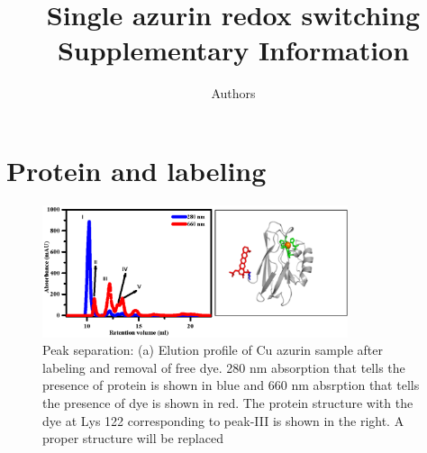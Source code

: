 \documentclass[11pt,a4paper,onecolumn]{article}
\newcommand*{\affaddr}[1]{#1} %
\newcommand*{\email}[1]{\texttt{#1}} %
\begin{document}
\author{Authors
}

\date{\vspace{1ex}} %

\title{\textbf{Single azurin redox switching}\\ \vspace{3ex} Supplementary Information \vspace{3ex}}

\maketitle
\tableofcontents
\pagebreak
\section{Protein and labeling}
\begin{figure}
  \centering
  \includegraphics[width=0.8\textwidth]{peak_separation.eps}
  \makeatletter
  \renewcommand{\fnum@figure}{\figurename~S\thefigure}
  \makeatother
  \caption{Peak separation: (a) Elution profile of Cu azurin sample after labeling and removal of free dye. 280 nm absorption that tells the presence of protein is shown in blue and 660 nm absrption that tells the presence of dye is shown in red. The protein structure with the dye at Lys 122 corresponding to peak-III is shown in the right. {A proper structure will be replaced}}
  \label{SIfig: peak_sep}
\end{figure}
\pagebreak
\end{document}
